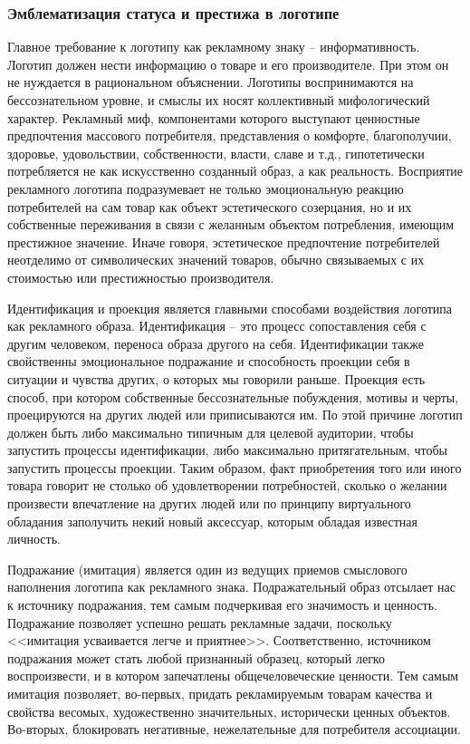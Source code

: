 \subsubsection{Эмблематизация статуса и престижа в логотипе}
Главное требование к логотипу как рекламному знаку -- информативность. Логотип
должен нести информацию о товаре и его производителе. При этом он не нуждается
в рациональном объяснении. Логотипы воспринимаются на бессознательном уровне,
и смыслы их носят коллективный мифологический характер. Рекламный миф,
компонентами которого выступают ценностные предпочтения массового потребителя,
представления о комфорте, благополучии, здоровье, удовольствии, собственности,
власти, славе и т.д., гипотетически потребляется не как искусственно созданный
образ, а как реальность. Восприятие рекламного логотипа подразумевает не только
эмоциональную реакцию потребителей на сам товар как объект эстетического
созерцания, но и их собственные переживания в связи с желанным объектом
потребления, имеющим престижное значение. Иначе говоря, эстетическое
предпочтение потребителей неотделимо от символических значений товаров, обычно
связываемых с их стоимостью или престижностью производителя.

Идентификация и проекция является главными способами воздействия логотипа как
рекламного образа. Идентификация -- это процесс сопоставления себя с другим
человеком, переноса образа другого на себя. Идентификации также свойственны
эмоциональное подражание и способность проекции себя в ситуации и чувства других,
о которых мы говорили раньше. Проекция есть способ, при котором собственные
бессознательные побуждения,  мотивы  и черты, проецируются на других людей
или приписываются им. По этой причине логотип должен быть либо максимально
типичным для целевой аудитории, чтобы запустить процессы идентификации, либо
максимально притягательным, чтобы запустить процессы проекции. Таким образом,
факт приобретения того или иного товара говорит не столько об удовлетворении
потребностей, сколько о желании произвести впечатление на других людей или по
принципу виртуального обладания заполучить некий новый аксессуар, которым обладая
известная личность.

Подражание (имитация) является один из ведущих приемов смыслового наполнения
логотипа как рекламного знака. Подражательный образ отсылает нас к источнику
подражания, тем самым подчеркивая его значимость и ценность. Подражание позволяет
успешно решать рекламные задачи, поскольку <<имитация усваивается легче и
приятнее>>\autocite[][404]{lotman1998iskusstve}. Соответственно, источником
подражания может стать любой признанный образец, который легко воспроизвести,
и в котором запечатлены общечеловеческие ценности. Тем самым имитация позволяет,
во-первых, придать рекламируемым товарам качества и свойства весомых,
художественно значительных, исторически ценных объектов. Во-вторых, блокировать
негативные, нежелательные для потребителя ассоциации.


